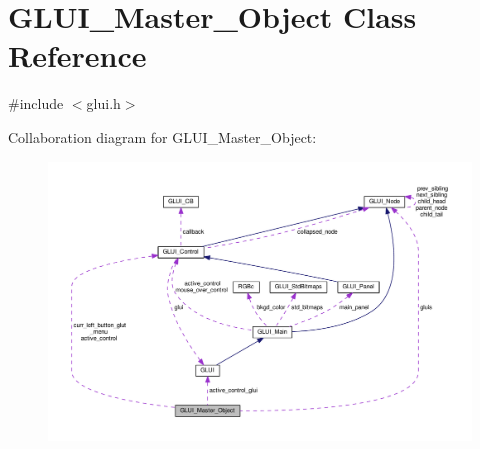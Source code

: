 \hypertarget{class_g_l_u_i___master___object}{\section{G\+L\+U\+I\+\_\+\+Master\+\_\+\+Object Class Reference}
\label{class_g_l_u_i___master___object}
}


{\ttfamily \#include $<$glui.\+h$>$}



Collaboration diagram for G\+L\+U\+I\+\_\+\+Master\+\_\+\+Object\+:\nopagebreak
\begin{figure}[H]
\begin{center}
\leavevmode
\includegraphics[width=350pt]{class_g_l_u_i___master___object__coll__graph}
\end{center}
\end{figure}
